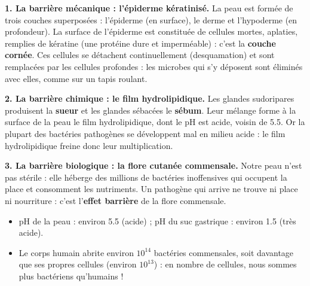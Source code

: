 \documentclass[11pt]{article}
\newcommand{\cle}[1]{{\popxbold\color{popdark}#1}}
\begin{document}
\textbf{1. La barrière mécanique : l'épiderme kératinisé.} La peau est formée de trois couches superposées : l'\cle{épiderme} (en surface), le \cle{derme} et l'\cle{hypoderme} (en profondeur). La surface de l'épiderme est constituée de cellules mortes, aplaties, remplies de \cle{kératine} (une protéine dure et imperméable) : c'est la \textbf{couche cornée}. Ces cellules se détachent continuellement (desquamation) et sont remplacées par les cellules profondes : les microbes qui s'y déposent sont éliminés avec elles, comme sur un tapis roulant.

\textbf{2. La barrière chimique : le film hydrolipidique.} Les glandes sudoripares produisent la \textbf{sueur} et les glandes sébacées le \textbf{sébum}. Leur mélange forme à la surface de la peau le \cle{film hydrolipidique}, dont le pH est acide, voisin de \num{5,5}. Or la plupart des bactéries pathogènes se développent mal en milieu acide : le film hydrolipidique freine donc leur multiplication.

\textbf{3. La barrière biologique : la flore cutanée commensale.} Notre peau n'est pas stérile : elle héberge des millions de bactéries inoffensives qui occupent la place et consomment les nutriments. Un pathogène qui arrive ne trouve ni place ni nourriture : c'est l'\textbf{effet barrière} de la flore commensale.

\begin{exemplebox}
\begin{itemize}
\item pH de la peau : environ \num{5,5} (acide) ; pH du suc gastrique : environ \num{1,5} (très acide).
\item Le corps humain abrite environ $10^{14}$ bactéries commensales, soit davantage que ses propres cellules (environ $10^{13}$) : en nombre de cellules, nous sommes plus bactériens qu'humains !
\end{itemize}
\end{exemplebox}
\end{document}
